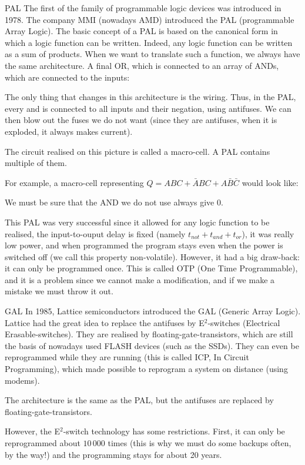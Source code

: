 \documentclass[a4paper]{article}
\begin{document}
\begin{parag}{PAL}
    The first of the family of programmable logic devices was introduced in 1978. The company MMI (nowadays AMD) introduced the PAL (programmable Array Logic). The basic concept of a PAL is based on the canonical form in which a logic function can be written. Indeed, any logic function can be written as a sum of products. When we want to translate such a function, we always have the same architecture. A final OR, which is connected to an array of ANDs, which are connected to the inputs:

    The only thing that changes in this architecture is the wiring. Thus, in the PAL, every and is connected to all inputs and their negation, using antifuses. We can then blow out the fuses we do not want (since they are antifuses, when it is exploded, it always makes current).

    The circuit realised on this picture is called a macro-cell. A PAL contains multiple of them. 

    For example, a macro-cell representing $Q = ABC + \bar{A}BC + A \bar{B} \bar{C}$ would look like:

    We must be sure that the AND we do not use always give 0.

    This PAL was very successful since it allowed for any logic function to be realised, the input-to-ouput delay is fixed (namely $t_{not} + t_{and} + t_{or}$), it was really low power, and when programmed the program stays even when the power is switched off (we call this property non-volatile). However, it had a big draw-back: it can only be programmed once. This is called OTP (One Time Programmable), and it is a problem since we cannot make a modification, and if we make a mistake we must throw it out.
\end{parag}

\begin{parag}{GAL}
    In 1985, Lattice semiconductors introduced the GAL (Generic Array Logic). Lattice had the great idea to replace the antifuses by E$^2$-switches (Electrical Erasable-switches). They are realised by floating-gate-transistors, which are still the basis of nowadays used FLASH devices (such as the SSDs). They can even be reprogrammed while they are running (this is called ICP, In Circuit Programming), which made possible to reprogram a system on distance (using modems).

    The architecture is the same as the PAL, but the antifuses are replaced by floating-gate-transistors.

    However, the E$^2$-switch technology has some restrictions. First, it can only be reprogrammed about $10\,000$ times (this is why we must do some backups often, by the way!) and the programming stays for about 20 years.

\end{parag}
\end{document}
